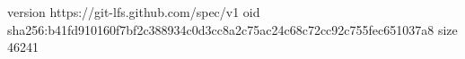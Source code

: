 version https://git-lfs.github.com/spec/v1
oid sha256:b41fd910160f7bf2c388934c0d3cc8a2c75ac24c68c72cc92c755fec651037a8
size 46241
